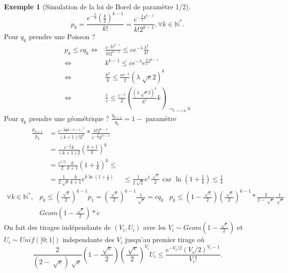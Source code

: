 \documentclass{article}
\theoremstyle{plain}%
\theoremstyle{definition}
\newtheorem{exmp}{Exemple}[section]
\theoremstyle{remark}
\begin{document}
\begin{exmp}[Simulation de la loi de Borel de paramètre 1/2]
	\[
		p_k = \frac{e^{-\frac{k}{2}} (\frac{k}{2})^{k-1}}{k!} = \frac{e^{-\frac{k}{2} k^{k-1}}}{k! 2^{k-1}}, \forall k \in \mathbb{N}^*
	.\]
	Pour $ q_k $ prendre une Poisson ? \begin{align*}
		p_k \leq c q_k \Leftrightarrow & \frac{e^{-\frac{k}{2} k^{k-1}}}{k! 2^{k-1}} \leq c e^{-\lambda } \frac{\lambda ^k}{k!}\\
						\Leftrightarrow & k^{k-1} \leq c e^{-\lambda }e^{\frac{k}{2} 2^{k-1}} \\
						\Leftrightarrow & \frac{k^k}{k} \leq \frac{ce^{-\lambda }}{2}(\lambda \sqrt[]{e}2)^k \\
						\Leftrightarrow & \frac{1}{c} \leq \frac{e^{-\lambda }}{2} (\frac{(\lambda \sqrt[]{e}2)^k}{k^k}k)_{ \to_{k \to +\infty} 0}
	\end{align*}
	Pour $ q_k $ prendre une géométrique ? $ \frac{q_{k+1}}{q_k} = 1 - \text{ paramètre } $ \begin{align*}
		\frac{p_{k+1}}{p_k} &= \frac{e^{- \frac{k+1}{2} (k+1)^k}}{(k+1)! 2^k} * \frac{k! 2^{k-1}}{e^{-\frac{k}{2}} k^{k-1}} \\
				&= \frac{e^{-\frac{1}{2}} k}{(k+1)2} (\frac{k+1}{k})^k \\
				&= \frac{e^{1/2}}{2} \frac{k}{k+1} (1+\frac{1}{k})^k \leq \\
				&= \frac{1}{2 \sqrt[]{e}} \frac{k}{k+1}e^{k \ln (1+\frac{1}{k})}
				& \leq \frac{1}{2 \sqrt[]{2}}e^1 \frac{\sqrt[]{e}}{2} \text{ car } \ln (1+ \frac{1}{k}) \leq \frac{1}{k}
	\end{align*} 
	\begin{align*}
		\forall k \in \mathbb{N}^*, & p_k \leq (\frac{\sqrt[]{e}}{2})^{k-1}p_1 = (\frac{\sqrt[]{e}}{2})^{k-1} \frac{1}{\sqrt[]{e}} = c q_k
									& p_k \leq (1-\frac{\sqrt[]{e}}{2})(\frac{\sqrt[]{e}}{2})^{k-1} * \frac{2}{2- \sqrt[]{e}}\frac{1}{\sqrt[]{e}} \\
									& Geom(1-\frac{\sqrt[]{e}}{2}) * c 
	\end{align*}
	On fait des tirages indépendants de $ (V_i,U_i) $ avec les $ V_i \sim Geom(1-\frac{\sqrt[]{e}}{2}) $ et $ U_i \sim Unif(]0;1[) $ independante des $ V_i $ jusqu'au premier tirage où 
	\[
		\frac{2}{(2-\sqrt[]{e})\sqrt[]{e}}(1-\frac{\sqrt[]{e}}{2})(\frac{\sqrt[]{e}}{2})^{V_i} U_i \leq \frac{e^{-V_i /2}(V_i / 2)^{V_i -1}}{V_i !}
	.\]
\end{exmp}
\end{document}
